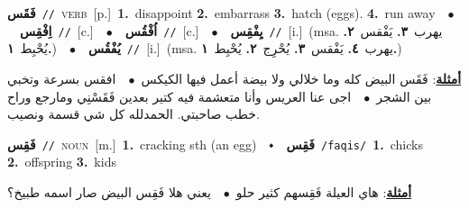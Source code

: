 \documentclass[10pt,a4paper,twoside]{article} %
\begin{document}
\begin{multicols}{2}
{\setlength\topsep{0pt}\textbf{\foreignlanguage{arabic}{فَقَس}}\ {\color{gray}\texttt{//}\color{black}}\ \textsc{verb}\ [p.]\ \textbf{1.}~disappoint  \textbf{2.}~embarrass  \textbf{3.}~hatch (eggs).  \textbf{4.}~run away\ \ $\bullet$\ \ \setlength\topsep{0pt}\textbf{\foreignlanguage{arabic}{اِفْقِس}}\ {\color{gray}\texttt{//}\color{black}}\ [c.]\ \ $\bullet$\ \ \setlength\topsep{0pt}\textbf{\foreignlanguage{arabic}{اُفْقُس}}\ {\color{gray}\texttt{//}\color{black}}\ [c.]\ \ $\bullet$\ \ \setlength\topsep{0pt}\textbf{\foreignlanguage{arabic}{يِفْقِس}}\ {\color{gray}\texttt{//}\color{black}}\ [i.]\ \color{gray}(msa. \foreignlanguage{arabic}{يهرب}~\foreignlanguage{arabic}{\textbf{٣.}}  \foreignlanguage{arabic}{يَفْقس}~\foreignlanguage{arabic}{\textbf{٢.}}  \foreignlanguage{arabic}{يُحْبِط}~\foreignlanguage{arabic}{\textbf{١.}})\color{black}\ \ $\bullet$\ \ \setlength\topsep{0pt}\textbf{\foreignlanguage{arabic}{يُفْقُس}}\ {\color{gray}\texttt{//}\color{black}}\ [i.]\ \color{gray}(msa. \foreignlanguage{arabic}{يهرب}~\foreignlanguage{arabic}{\textbf{٤.}}  \foreignlanguage{arabic}{يَفْقس}~\foreignlanguage{arabic}{\textbf{٣.}}  \foreignlanguage{arabic}{يُحْرِج}~\foreignlanguage{arabic}{\textbf{٢.}}  \foreignlanguage{arabic}{يُحْبِط}~\foreignlanguage{arabic}{\textbf{١.}})\color{black}\  \begin{flushright}\color{gray}\foreignlanguage{arabic}{\textbf{\underline{\foreignlanguage{arabic}{أمثلة}}}: فَقَس البيض كله وما خلالي ولا بيضة أعمل فيها الكيكس\ $\bullet$\ \  افقس بسرعة وتخبي بين الشجر\ $\bullet$\ \  اجى عنا العريس وأنا متعشمة فيه كتير بعدين فَقَسْنِي ومارجع وراح خطب صاحبتي. الحمدلله كل شي قسمة ونصيب.}\end{flushright}\color{black}} \vspace{2mm}

{\setlength\topsep{0pt}\textbf{\foreignlanguage{arabic}{فَقِس}}\ {\color{gray}\texttt{//}\color{black}}\ \textsc{noun}\ [m.]\ \textbf{1.}~cracking sth (an egg)\ \ $\smblkdiamond$\ \ \setlength\topsep{0pt}\textbf{\foreignlanguage{arabic}{فَقِس}}\ {\color{gray}\texttt{/faqis/}\color{black}}\ \textbf{1.}~chicks  \textbf{2.}~offspring  \textbf{3.}~kids\  \begin{flushright}\color{gray}\foreignlanguage{arabic}{\textbf{\underline{\foreignlanguage{arabic}{أمثلة}}}: هاي العيلة فَقِسهم كثير حلو\ $\bullet$\ \  يعني هلا فَقِس البيض صار اسمه طبيخ؟}\end{flushright}\color{black}} \vspace{2mm}


\end{multicols}
\end{document}
